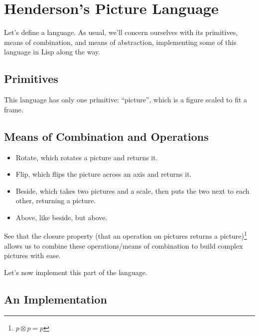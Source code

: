 \documentclass[9pt]{report}
\begin{document}
\section{Henderson's Picture Language}
\label{sec:org15ce6d7}

Let's define a language. As usual, we'll concern ourselves with its
primitives, means of combination, and means of abstraction,
implementing some of this language in Lisp along the way.


\subsection{Primitives}
\label{sec:org88b4088}
This language has only one primitive: ``picture'', which is a figure
scaled to fit a frame.


\subsection{Means of Combination and Operations}
\label{sec:org620099d}

\begin{itemize}
\item Rotate, which rotates a picture and returns it.
\item Flip, which flips the picture across an axis and returns it.
\item Beside, which takes two pictures and a scale, then puts the two
next to each other, returning a picture.
\item Above, like beside, but above.
\end{itemize}

See that the closure property (that an operation on pictures
returns a picture)\footnote{\(p \otimes p = p\)} allows us to combine these operations/means of
combination to build complex pictures with ease.

Let's now implement this part of the language.

\subsection{An Implementation}
\label{sec:orgb023320}
\end{document}
